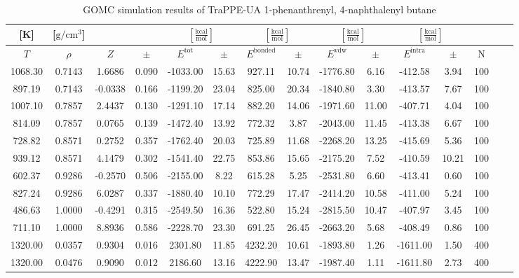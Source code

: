 \documentclass[%
 aip,
 jcp,
 sd,%
 amsmath,amssymb,
]{revtex4-1}
\begin{document}
\begin{table*}[!htbp]
\centering
\caption{GOMC simulation results of TraPPE-UA 1-phenanthrenyl, 4-naphthalenyl butane}
\label{tab:sim-res-TraPPE-1p4nB}
\begin{ruledtabular}
\begin{tabular}{ccccccccccccccc}
[K] & [$\mathrm{g/cm^3}$] &  &  & \multicolumn{2}{c}{$[\frac{\mathrm{kcal}}{\mathrm{mol}}]$} & \multicolumn{2}{c}{$[\frac{\mathrm{kcal}}{\mathrm{mol}}]$} & \multicolumn{2}{c}{$[\frac{\mathrm{kcal}}{\mathrm{mol}}]$} &\multicolumn{2}{c}{$[\frac{\mathrm{kcal}}{\mathrm{mol}}]$} & \\
\hline
$T$ & $\rho$ & $Z$ & $\pm$ & $E^{\mathrm{tot}}$ & $\pm$ & $E^{\mathrm{bonded}}$ & $\pm$ & $E^{\mathrm{vdw}}$ & $\pm$ & $E^{\mathrm{intra}}$ & $\pm$ & N\\
\hline
1068.30	&	0.7143	&	1.6686	&	0.090	&	-1033.00	&	15.63	&	927.11	&	10.74	&	-1776.80	&	6.16	&	-412.58	&	3.94	&	100	\\
897.19	&	0.7143	&	-0.0338	&	0.166	&	-1199.20	&	23.04	&	825.00	&	20.34	&	-1840.80	&	3.30	&	-413.57	&	7.67	&	100	\\
1007.10	&	0.7857	&	2.4437	&	0.130	&	-1291.10	&	17.14	&	882.20	&	14.06	&	-1971.60	&	11.00	&	-407.71	&	4.04	&	100	\\
814.09	&	0.7857	&	0.0765	&	0.139	&	-1472.40	&	13.92	&	772.32	&	3.87	&	-2043.00	&	11.45	&	-413.38	&	6.67	&	100	\\
728.82	&	0.8571	&	0.2752	&	0.357	&	-1762.40	&	20.03	&	725.89	&	11.68	&	-2268.20	&	13.25	&	-415.69	&	5.36	&	100	\\
939.12	&	0.8571	&	4.1479	&	0.302	&	-1541.40	&	22.75	&	853.86	&	15.65	&	-2175.20	&	7.52	&	-410.59	&	10.21	&	100	\\
602.37	&	0.9286	&	-0.2570	&	0.506	&	-2155.00	&	8.22	&	615.28	&	5.25	&	-2531.80	&	6.60	&	-413.41	&	0.60	&	100	\\
827.24	&	0.9286	&	6.0287	&	0.337	&	-1880.40	&	10.10	&	772.29	&	17.47	&	-2414.20	&	10.58	&	-411.00	&	5.24	&	100	\\
486.63	&	1.0000	&	-0.4291	&	0.315	&	-2549.50	&	16.36	&	522.80	&	15.24	&	-2815.50	&	10.47	&	-407.97	&	3.45	&	100	\\
711.10	&	1.0000	&	8.8936	&	0.586	&	-2228.70	&	23.30	&	691.25	&	26.45	&	-2663.20	&	5.68	&	-408.49	&	0.86	&	100	\\
1320.00	&	0.0357	&	0.9304	&	0.016	&	2301.80	&	11.85	&	4232.20	&	10.61	&	-1893.80	&	1.26	&	-1611.00	&	1.50	&	400	\\
1320.00	&	0.0476	&	0.9090	&	0.012	&	2186.60	&	13.16	&	4222.90	&	13.47	&	-1987.40	&	1.11	&	-1611.80	&	2.73	&	400	\\

\end{tabular}
\end{ruledtabular}
\end{table*}
\end{document}
